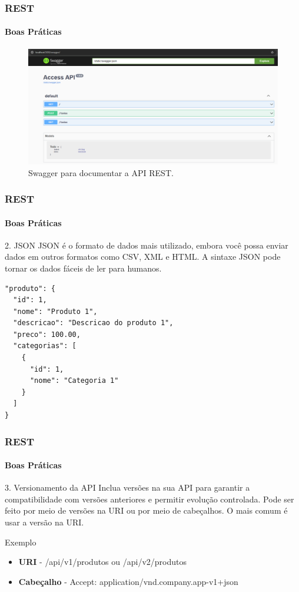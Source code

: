 \documentclass[
	9pt, %
	t, %
]{beamer}
\newcommand{\yellowbox}[1]{\colorbox{yellow!75}{#1}}
\begin{document}
\begin{frame}
	\frametitle{REST}
	\framesubtitle{Boas Práticas}

	\begin{figure}[h!]
		\includegraphics[width=1.0\linewidth]{swagger.png}
		\caption{Swagger para documentar a API REST.}
		\label{fig:swagger}
	\end{figure}
	
	
\end{frame}

\begin{frame}[fragile]
    \frametitle{REST}
	\framesubtitle{Boas Práticas}

	\begin{block}{2. JSON}
		JSON é o formato de dados mais utilizado, embora você possa enviar dados em outros formatos como CSV, XML e HTML. A sintaxe JSON pode tornar os dados fáceis de ler para humanos.
    
\begin{lstlisting}[basicstyle=\small]
"produto": {
  "id": 1,
  "nome": "Produto 1",
  "descricao": "Descricao do produto 1",
  "preco": 100.00,
  "categorias": [
	{
	  "id": 1,
	  "nome": "Categoria 1"
	}
  ]
}

\end{lstlisting}
\end{block}
\end{frame}

\begin{frame}
	\frametitle{REST}
	\framesubtitle{Boas Práticas}

	\begin{block}{3. Versionamento da API}
		Inclua versões na sua API para garantir a compatibilidade com versões anteriores e permitir evolução controlada. 
		Pode ser feito por meio de versões na URI ou por meio de cabeçalhos. O mais comum é usar a versão na URI.
	\end{block}

	\begin{exampleblock}{Exemplo}
		\begin{itemize}
			\item \textbf{URI} - \yellowbox{/api/v1/produtos} ou \yellowbox{/api/v2/produtos}
			\item \textbf{Cabeçalho} - \yellowbox{Accept: application/vnd.company.app-v1+json}
		\end{itemize}
	\end{exampleblock}

\end{frame}
\end{document}
